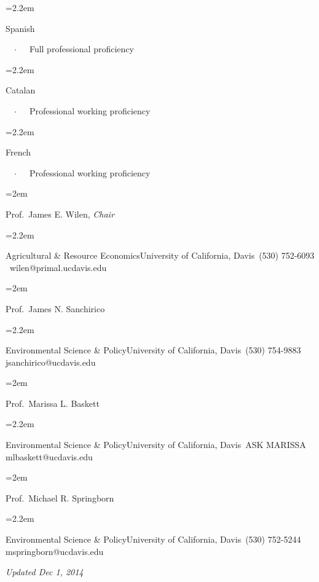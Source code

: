\documentclass{scrartcl}
\newlength{\datebox}\settowidth{\datebox}{graduate student researcher forever love yes} %
\newcommand{\EduNewEntry}[1]{\noindent\hangindent=2em\hangafter=0 \parbox{\datebox}{#1}\vspace{0.3em}} %
\newcommand{\Description}[1]{\noindent\hangindent=2.2em\hangafter=0\noindent\raggedright\footnotesize{#1}\par\normalsize\vspace{1em}} %
\begin{document}
\begin{cv}{}
\Description{\parbox{\langbox}{{Spanish}}\ \ $\cdotp$\ \ \ Full professional proficiency}

\vspace{-0.5em} %

\Description{\parbox{\langbox}{{Catalan}}\ \ $\cdotp$\ \ \ Professional working proficiency}
\vspace{-0.5em} %

\Description{\parbox{\langbox}{{French}}\ \ $\cdotp$\ \ \ Professional working proficiency}

\vspace{1em} %


\noindent{}\vspace{1em}

\vspace{1em}

\begin{minipage}[t]{0.5\textwidth}
\EduNewEntry{Prof.~James E. Wilen, {\it Chair}}
\Description{Agricultural \& Resource Economics\newline University of California, Davis\newline \Telefon \, (530) 752-6093 \newline  \Letter \, wilen@primal.ucdavis.edu}

\EduNewEntry{Prof.~James N. Sanchirico}
\Description{Environmental Science \& Policy\newline University of California, Davis\newline  \Telefon \, (530) 754-9883 \newline  \Letter \, jsanchirico@ucdavis.edu}
\end{minipage}
\begin{minipage}[t]{0.45\textwidth}
\EduNewEntry{Prof.~Marissa L. Baskett}
\Description{Environmental Science \& Policy\newline University of California, Davis\newline  \Telefon \, ASK MARISSA \newline   \Letter \, mlbaskett@ucdavis.edu}

\EduNewEntry{Prof.~Michael R. Springborn}
\Description{Environmental Science \& Policy\newline University of California, Davis\newline  \Telefon \, (530) 752-5244 \newline  \Letter \, mspringborn@ucdavis.edu}
\end{minipage}

\vspace{2em}
{\it Updated Dec 1, 2014}
\end{cv}
\end{document}
